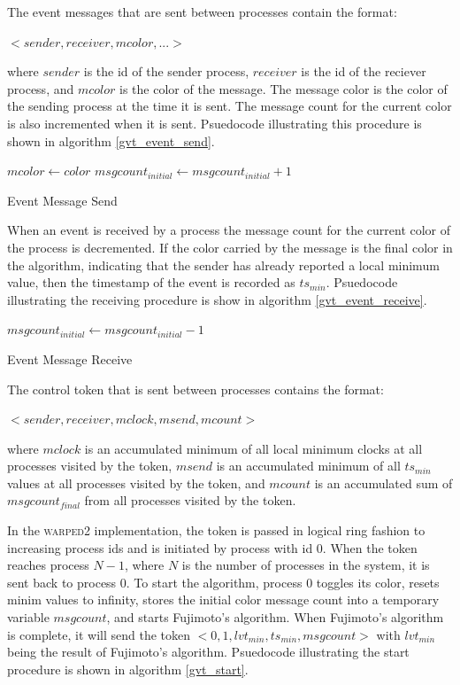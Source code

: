 \documentclass[11pt]{book}
\begin{document}
\noindent
The event messages that are sent between processes contain the format:

    $<sender, receiver, mcolor,...>$

\noindent
where $sender$ is the id of the sender process, $receiver$ is the id of the reciever process,
and $mcolor$ is the color of the message. The message color is the color of the sending
process at the time it is sent. The message count for the current color is also incremented
when it is sent. Psuedocode illustrating this procedure is shown in algorithm \ref{gvt_event_send}.

\begin{algorithm}
\DontPrintSemicolon
\SetAlgoVlined
    $mcolor \gets color$\;
     {
      $msgcount_{initial} \gets msgcount_{initial} + 1$\;
    }
\caption{Event Message Send}\label{gvt_event_send}
\end{algorithm}

When an event is received by a process the message count for the current color of the process
is decremented. If the color carried by the message is the final color in the algorithm,
indicating that the sender has already reported a local minimum value, then the timestamp
of the event is recorded as $ts_{min}$. Psuedocode illustrating the receiving procedure is
show in algorithm \ref{gvt_event_receive}.

\begin{algorithm}
\DontPrintSemicolon
\SetAlgoVlined
     {
        $msgcount_{initial} \gets msgcount_{initial} - 1$\;
    }
\caption{Event Message Receive}\label{gvt_event_receive}
\end{algorithm}

\noindent
The control token that is sent between processes contains the format:

    $<sender, receiver, mclock, msend, mcount>$

\noindent
where $mclock$ is an accumulated minimum of all local minimum clocks at all processes
visited by the token, $msend$ is an accumulated minimum of all $ts_{min}$ values at all
processes visited by the token, and $mcount$ is an accumulated sum of $msgcount_{final}$
from all processes visited by the token.

In the \textsc{warped2} implementation, the token is passed in logical ring fashion to
increasing process ids and is initiated by process with id 0. When the token reaches
process $N-1$, where $N$ is the number of processes in the system, it is sent back to
process 0. To start the algorithm, process 0 toggles its color, resets minim values to
infinity, stores the initial color message count into a temporary variable $msgcount$, and
starts Fujimoto's algorithm. When Fujimoto's algorithm is complete, it will send the token
$<0, 1, lvt_{min}, ts_{min}, msgcount>$ with $lvt_{min}$ being the result of Fujimoto's
algorithm. Psuedocode illustrating the start procedure is shown in algorithm \ref{gvt_start}.
\end{document}
